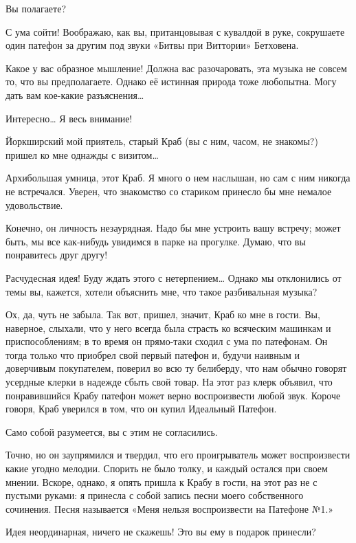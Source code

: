 \documentclass[../main.tex]{subfiles}
\begin{document}
\begin{Dialogue}
 Вы полагаете?

 С ума сойти! Воображаю, как вы, пританцовывая с кувалдой в руке, сокрушаете один патефон за другим под звуки «Битвы при Виттории» Бетховена.

 Какое у вас образное мышление! Должна вас разочаровать, эта музыка не совсем то, что вы предполагаете. Однако её истинная природа тоже любопытна. Могу дать вам кое-какие разъяснения\ldots{}

 Интересно\ldots{} Я весь внимание!

 Йоркширский мой приятель, старый Краб (вы с ним, часом, не знакомы?) пришел ко мне однажды с визитом\ldots{}

 {\Large А}рхибольшая умница, этот Краб. Я много о нем наслышан, но сам с ним никогда не встречался. Уверен, что знакомство со стариком принесло бы мне немалое удовольствие.

 Конечно, он личность незаурядная. Надо бы мне устроить вашу встречу; может быть, мы все как-нибудь увидимся в парке на прогулке. Думаю, что вы понравитесь друг другу!

 Расчудесная идея! Буду ждать этого с нетерпением\ldots{} Однако мы отклонились от темы вы, кажется, хотели объяснить мне, что такое разбивальная музыка?

 Ох, да, чуть не забыла. Так вот, пришел, значит, Краб ко мне в гости. Вы, наверное, слыхали, что у него всегда была страсть ко всяческим машинкам и приспособлениям; в то время он прямо-таки сходил с ума по патефонам. Он тогда только что приобрел свой первый патефон и, будучи наивным и доверчивым покупателем, поверил во всю ту белиберду, что нам обычно говорят усердные клерки в надежде сбыть свой товар. На этот раз клерк объявил, что понравившийся Крабу патефон может верно воспроизвести любой звук. Короче говоря, Краб уверился в том, что он купил Идеальный Патефон.

 Само собой разумеется, вы с этим не согласились.

 Точно, но он заупрямился и твердил, что его проигрыватель может воспроизвести какие угодно мелодии. Спорить не было толку, и каждый остался при своем мнении. Вскоре, однако, я опять пришла к Крабу в гости, на этот раз не с пустыми руками: я принесла с собой запись песни моего собственного сочинения. Песня называется «Меня нельзя воспроизвести на Патефоне №1.»

 Идея неординарная, ничего не скажешь! Это вы ему в подарок принесли?


\end{Dialogue}
\end{document}
